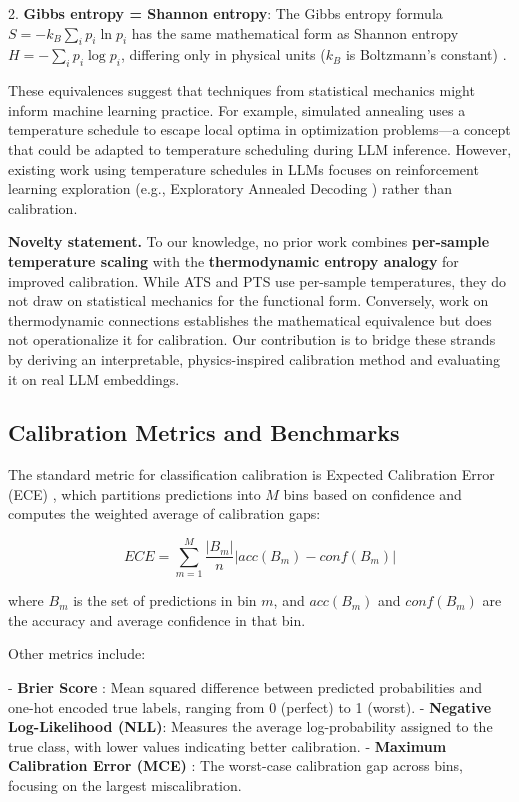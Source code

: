\documentclass[11pt,letterpaper]{article}
\begin{document}
2. \textbf{Gibbs entropy = Shannon entropy}: The Gibbs entropy formula $S = -k_B \sum_i p_i \ln p_i$ has the same mathematical form as Shannon entropy $H = -\sum_i p_i \log p_i$, differing only in physical units ($k_B$ is Boltzmann's constant) \cite{Jaynes1957}.

These equivalences suggest that techniques from statistical mechanics might inform machine learning practice. For example, simulated annealing \cite{Kirkpatrick1983} uses a temperature schedule to escape local optima in optimization problems---a concept that could be adapted to temperature scheduling during LLM inference. However, existing work using temperature schedules in LLMs focuses on reinforcement learning exploration (e.g., Exploratory Annealed Decoding \cite{Yang2024}) rather than calibration.

\textbf{Novelty statement.} To our knowledge, no prior work combines \textbf{per-sample temperature scaling} with the \textbf{thermodynamic entropy analogy} for improved calibration. While ATS \cite{Joy2023} and PTS \cite{Tomani2021} use per-sample temperatures, they do not draw on statistical mechanics for the functional form. Conversely, work on thermodynamic connections \cite{PhysicsSE2023, TowardsAI2023} establishes the mathematical equivalence but does not operationalize it for calibration. Our contribution is to bridge these strands by deriving an interpretable, physics-inspired calibration method and evaluating it on real LLM embeddings.

\subsection{Calibration Metrics and Benchmarks}

The standard metric for classification calibration is Expected Calibration Error (ECE) \cite{Guo2017}, which partitions predictions into $M$ bins based on confidence and computes the weighted average of calibration gaps:

$$ECE = \sum_{m=1}^M \frac{|B_m|}{n} |acc(B_m) - conf(B_m)|$$

where $B_m$ is the set of predictions in bin $m$, and $acc(B_m)$ and $conf(B_m)$ are the accuracy and average confidence in that bin.

Other metrics include:

- \textbf{Brier Score} \cite{Brier1950}: Mean squared difference between predicted probabilities and one-hot encoded true labels, ranging from 0 (perfect) to 1 (worst).
- \textbf{Negative Log-Likelihood (NLL)}: Measures the average log-probability assigned to the true class, with lower values indicating better calibration.
- \textbf{Maximum Calibration Error (MCE)} \cite{Guo2017}: The worst-case calibration gap across bins, focusing on the largest miscalibration.
\end{document}
